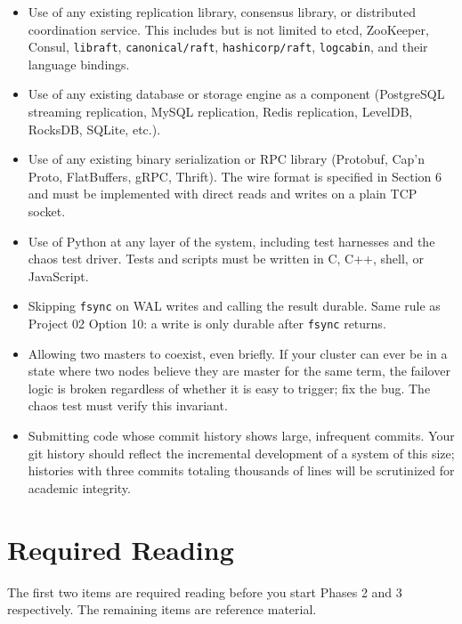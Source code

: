 \documentclass[11pt,a4paper]{article}
\begin{document}
\begin{notebox}
\begin{itemize}
\item Use of any existing replication library, consensus library, or distributed coordination service. This includes but is not limited to etcd, ZooKeeper, Consul, \texttt{libraft}, \texttt{canonical/raft}, \texttt{hashicorp/raft}, \texttt{logcabin}, and their language bindings.
\item Use of any existing database or storage engine as a component (PostgreSQL streaming replication, MySQL replication, Redis replication, LevelDB, RocksDB, SQLite, etc.).
\item Use of any existing binary serialization or RPC library (Protobuf, Cap'n Proto, FlatBuffers, gRPC, Thrift). The wire format is specified in Section 6 and must be implemented with direct reads and writes on a plain TCP socket.
\item Use of Python at any layer of the system, including test harnesses and the chaos test driver. Tests and scripts must be written in C, C++, shell, or JavaScript.
\item Skipping \texttt{fsync} on WAL writes and calling the result durable. Same rule as Project 02 Option 10: a write is only durable after \texttt{fsync} returns.
\item Allowing two masters to coexist, even briefly. If your cluster can ever be in a state where two nodes believe they are master for the same term, the failover logic is broken regardless of whether it is easy to trigger; fix the bug. The chaos test must verify this invariant.
\item Submitting code whose commit history shows large, infrequent commits. Your git history should reflect the incremental development of a system of this size; histories with three commits totaling thousands of lines will be scrutinized for academic integrity.
\end{itemize}
\end{notebox}

\section{Required Reading}

The first two items are required reading before you start Phases 2 and 3 respectively. The remaining items are reference material.
\end{document}
